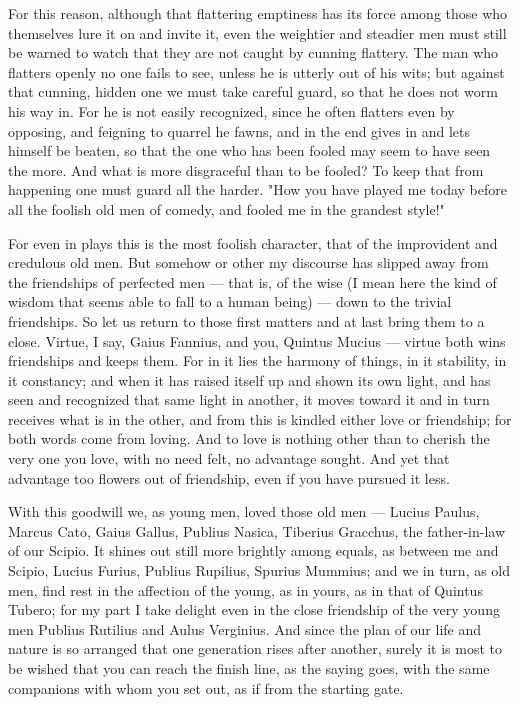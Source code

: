  For this reason, although that flattering emptiness has its force among those who themselves lure it on and invite it, even the weightier and steadier men must still be warned to watch that they are not caught by cunning flattery. The man who flatters openly no one fails to see, unless he is utterly out of his wits; but against that cunning, hidden one we must take careful guard, so that he does not worm his way in. For he is not easily recognized, since he often flatters even by opposing, and feigning to quarrel he fawns, and in the end gives in and lets himself be beaten, so that the one who has been fooled may seem to have seen the more. And what is more disgraceful than to be fooled? To keep that from happening one must guard all the harder. "How you have played me today before all the foolish old men of comedy, and fooled me in the grandest style!"

 For even in plays this is the most foolish character, that of the improvident and credulous old men. But somehow or other my discourse has slipped away from the friendships of perfected men — that is, of the wise (I mean here the kind of wisdom that seems able to fall to a human being) — down to the trivial friendships. So let us return to those first matters and at last bring them to a close. Virtue, I say, Gaius Fannius, and you, Quintus Mucius — virtue both wins friendships and keeps them. For in it lies the harmony of things, in it stability, in it constancy; and when it has raised itself up and shown its own light, and has seen and recognized that same light in another, it moves toward it and in turn receives what is in the other, and from this is kindled either love or friendship; for both words come from loving. And to love is nothing other than to cherish the very one you love, with no need felt, no advantage sought. And yet that advantage too flowers out of friendship, even if you have pursued it less.

 With this goodwill we, as young men, loved those old men — Lucius Paulus, Marcus Cato, Gaius Gallus, Publius Nasica, Tiberius Gracchus, the father-in-law of our Scipio. It shines out still more brightly among equals, as between me and Scipio, Lucius Furius, Publius Rupilius, Spurius Mummius; and we in turn, as old men, find rest in the affection of the young, as in yours, as in that of Quintus Tubero; for my part I take delight even in the close friendship of the very young men Publius Rutilius and Aulus Verginius. And since the plan of our life and nature is so arranged that one generation rises after another, surely it is most to be wished that you can reach the finish line, as the saying goes, with the same companions with whom you set out, as if from the starting gate.

